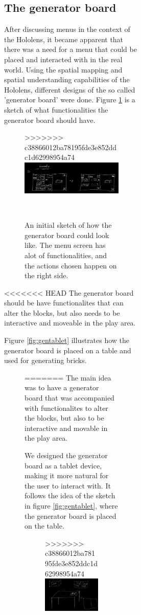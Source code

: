 \begin{figure}[h]
\begin{figure}[h]
\begin{figure}[h]
\subsection{The generator board}
After discussing menus in the context of the Hololens, it became apparent that there was a need for a menu that could be placed and interacted with in the real world. Using the spatial mapping and spatial understanding capabilities of the Hololens, different designs of the so called 'generator board' were done. Figure \ref{fig:genboard1} is a sketch of what functionalities the generator board should have.
\begin{figure}[t]
>>>>>>> c38866012ba78195fde3e852ddc1d62998954a74
	\centering
	\includegraphics[width=0.7\columnwidth]{figures/Generator/gen5.png}
	\caption{An initial sketch of how the generator board could look like. The menu screen has alot of functionalities, and the actions chosen happen on the right side.}~\label{fig:genboard1}
\end{figure}
<<<<<<< HEAD
The generator board should be have functionalites that can alter the blocks, but also needs to be interactive and moveable in the play area.\par
Figure \ref{fig:gentablet} illustrates how the generator board is placed on a table and used for generating bricks.
\begin{figure}[h]
=======
The main idea was to have a generator board that was accompanied with functionalites to alter the blocks, but also to be interactive and movable in the play area.\par
We designed the generator board as a tablet device, making it more natural for the user to interact with. It follows the idea of the sketch in figure \ref{fig:gentablet}, where the generator board is placed on the table.
\begin{figure}[t]
>>>>>>> c38866012ba78195fde3e852ddc1d62998954a74
	\centering
	\includegraphics[width=0.7\columnwidth]{figures/Generator/gen6.png}

\end{figure}
\end{figure}
\end{figure}
\end{figure}
\end{figure}
